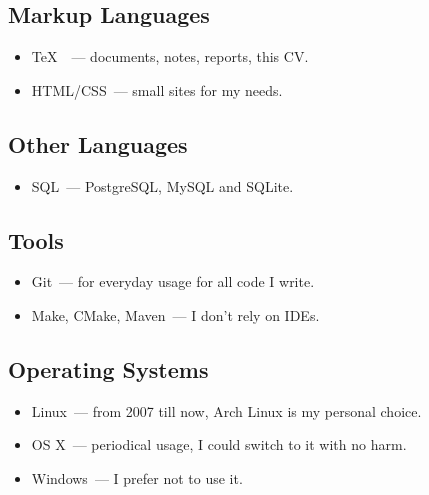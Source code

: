     \subsection*{Markup Languages}

      \begin{itemize}

        \item \TeX\ ~--- documents, notes, reports, this CV.

        \item HTML/CSS~--- small sites for my needs.

      \end{itemize}

    \subsection*{Other Languages}

      \begin{itemize}

        \item SQL~--- PostgreSQL, MySQL and SQLite.

      \end{itemize}

    \subsection*{Tools}

      \begin{itemize}

        \item Git~--- for everyday usage for all code I write.

        \item Make, CMake, Maven~--- I don’t rely on IDEs.

      \end{itemize}

    \subsection*{Operating Systems}

      \begin{itemize}

        \item Linux~--- from 2007 till now, Arch Linux is my personal choice.

        \item OS X~--- periodical usage, I could switch to it with no harm.

        \item Windows~--- I prefer not to use it.

      \end{itemize}


